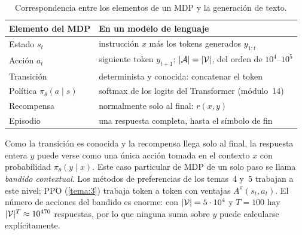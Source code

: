 \begin{table}[h]
\centering\small
\begin{tabular}{@{}ll@{}}
\toprule
Elemento del MDP & En un modelo de lenguaje \\
\midrule
Estado $s_t$ & instrucción $x$ más los tokens generados $y_{1:t}$ \\
Acción $a_t$ & siguiente token $y_{t+1}$; $\lvert\mathcal{A}\rvert=\lvert\mathcal{V}\rvert$, del orden de $10^{4}$--$10^{5}$ \\
Transición & determinista y conocida: concatenar el token \\
Política $\pi_\theta(a\mid s)$ & softmax de los logits del Transformer (módulo~14) \\
Recompensa & normalmente solo al final: $r(x,y)$ \\
Episodio & una respuesta completa, hasta el símbolo de fin \\
\bottomrule
\end{tabular}
\caption{Correspondencia entre los elementos de un MDP y la generación de texto.}
\label{tab:mdp-llm}
\end{table}

\addtocounter{figure}{1}%

\begin{observacion}\label{obs:bandido}
Como la transición es conocida y la recompensa llega solo al final, la respuesta entera $y$ puede verse como una única acción tomada en el contexto $x$ con probabilidad $\pi_\theta(y\mid x)$. Este caso particular de MDP de un solo paso se llama \emph{bandido contextual}. Los métodos de preferencias de los temas~4 y~5 trabajan a este nivel; PPO (\cref{tema:3}) trabaja token a token con ventajas $A^{\pi}(s_t,a_t)$. El número de acciones del bandido es enorme: con $\lvert\mathcal{V}\rvert=5\cdot 10^{4}$ y $T=100$ hay $\lvert\mathcal{V}\rvert^{T}\approx 10^{470}$ respuestas, por lo que ninguna suma sobre $y$ puede calcularse explícitamente.
\end{observacion}

\addtocounter{definicion}{1}%

